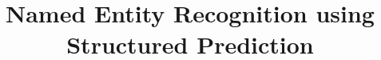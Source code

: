 \documentclass[a4paper,10pt]{article}
\title{Named Entity Recognition using Structured Prediction}
\author{}
\date{}
\begin{document}
\maketitle






{\small


}
\end{document}

